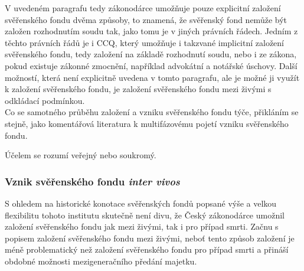 \documentclass{article}
\begin{document}
V uvedeném paragrafu tedy zákonodárce umožňuje pouze explicitní založení svěřenského fondu dvěma způsoby, to znamená, že svěřenský fond nemůže být založen rozhodnutím soudu tak, jako tomu je v jiných právních řádech. Jedním z těchto právních řádů je i CCQ, který umožňuje i takzvané implicitní založení svěřenského fondu, tedy založení na základě rozhodnutí soudu, nebo i ze zákona, pokud existuje zákonné zmocnění, například advokátní a notářské úschovy. Další možností, která není explicitně uvedena v tomto paragrafu, ale je možné ji využít k založení svěřenského fondu, je založení svěřenského fondu mezi živými s odkládací podmínkou.\\

Co se samotného průběhu založení a vzniku svěřenského fondu týče, přikláním se stejně, jako komentářová literatura k multifázovému pojetí vzniku svěřenského fondu.


Účelem se rozumí veřejný nebo soukromý.

\subsubsection{Vznik svěřenského fondu \textit{inter vivos}}

S ohledem na historické konotace svěřenských fondů popsané výše a velkou flexibilitu tohoto institutu skutečně není divu, že Český zákonodárce umožnil založení svěřenského fondu jak mezi živými, tak i pro případ smrti. Začnu s popisem založení svěřenského fondu mezi živými, neboť tento způsob založení je méně problematický než založení svěřenského fondu pro případ smrti a přináší obdobné možnosti mezigeneračního předání majetku.\\
\end{document}
